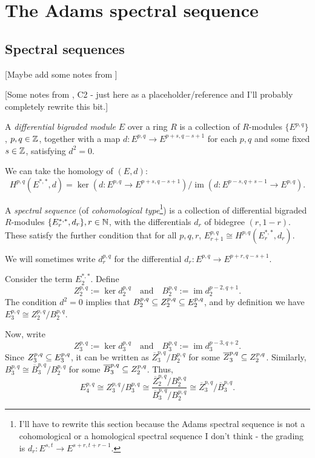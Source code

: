 \documentclass{MetricNotes2023}
\def\subq{\ensuremath\subseteq}
\def\inte{\ensuremath\mathbb{Z}}
\def\nat{\ensuremath\mathbb{N}}
\DeclareMathOperator{\im}{im}
\begin{document}
\section{The Adams spectral sequence}

\subsection{Spectral sequences}

[Maybe add some notes from \autocite{ass}]

[Some notes from \autocite{spectral_sequences}, C2 - just here as a placeholder/reference and I'll probably completely rewrite this bit.]

\begin{definition}
A \textit{differential bigraded module} \(E\) over a ring \(R\) is a collection of \(R\)-modules \(\{E^{p, q}\}\), \(p, q\in \inte\), together with a map \(d : E^{p, q} \to E^{p+s, q-s+1}\) for each \(p, q\) and some fixed \(s \in \inte\), satisfying \(d^2=0\). 
\end{definition}

We can take the homology of \((E, d)\):
\[H^{p, q}(E^{*, *}, d)=\ker(d : E^{p, q}\to E^{p+s, q-s+1})/\im(d : E^{p-s, q+s-1}\to E^{p, q}).\]

\begin{definition}
A \textit{spectral sequence} (of \textit{cohomological type}\footnote{I'll have to rewrite this section because the Adams spectral sequence is not a cohomological or a homological spectral sequence I don't think - the grading is \(d_r : E^{s,t}\to E^{s+r,t+r-1}\).}) is a collection of differential bigraded \(R\)-modules \(\{E^{*, *}_r, d_r\}, r \in \nat\), with the differentials \(d_r\) of bidegree \((r, 1-r)\). These satisfy the further condition that for all \(p, q, r\), \(E^{p, q}_{r+1}\cong H^{p, q}(E_r^{*, *}, d_r)\).
\end{definition}

We will sometimes write \(d^{p, q}_r\) for the differential \(d_r : E^{p, q}\to E^{p+r,q-s+1}\). 

Consider the term \(E_2^{*, *}\). Define 
\[Z_2^{p, q}:=\ker d_2^{p,q} \quad \text{and} \quad B_2^{p,q}:=\im d_2^{p-2,q+1}.\]
The condition \(d^2=0\) implies that \(B_2^{p,q}\subq Z_2^{p,q}\subq E_2^{p,q}\), and by definition we have \(E_3^{p,q}\cong Z^{p,q}_2/B_2^{p,q}\). 

Now, write 
\[Z_3^{p, q}:=\ker d_3^{p,q} \quad \text{and} \quad B_3^{p,q}:=\im d_3^{p-3,q+2}.\]
Since \(Z_3^{p,q}\subq E^{p,q}_3\), it can be written as \(\overline{Z}_3^{p,q}/B_2^{p,q}\) for some \(\overline{Z}_3^{p,q}\subq Z_2^{p,q}\). Similarly, \(B_3^{p,q}\cong \overline B_3^{p,q}/B_2^{p,q}\) for some \(\overline B_3^{p,q}\subq Z_2^{p,q}\). Thus,
\[E_4^{p,q}\cong Z_3^{p,q}/B_3^{p,q}\cong \frac{\overline Z_2^{p,q}/B_2^{p,q}}{\overline B_3^{p,q}/B_2^{p,q}}\cong \overline Z_3^{p,q}/\overline B_3^{p,q}.\]
\end{document}
